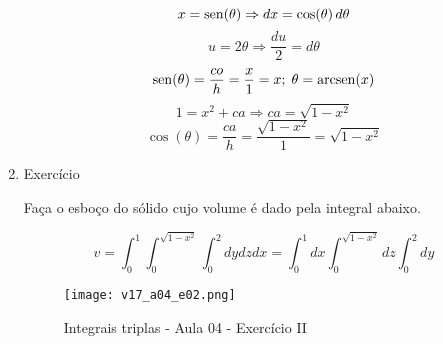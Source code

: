 \begin{enumerate}
\begin{equation*}
		x = \operatorname{sen}(\theta) \Rightarrow dx = \cos(\theta)\, d\theta
	\end{equation*}
	\begin{equation*}
		u = 2\theta \Rightarrow \dfrac{du}{2} = d\theta
	\end{equation*}
	\begin{equation*}
		\operatorname{sen}(\theta) = \dfrac{co}{h} = \dfrac{x}{1} = x;\; \theta = \operatorname{arcsen}(x)	
	\end{equation*}
	\begin{equation*}
		1 = x^2 + ca \Rightarrow ca = \sqrt{1 - x^2}
	\end{equation*}
	\begin{equation*}
		\cos(\theta) = \dfrac{ca}{h} = \dfrac{\sqrt{1 - x^2}}{1} = \sqrt{1 - x^2}
	\end{equation*}
	
	\item Exercício
	
	Faça o esboço do sólido cujo volume é dado pela integral abaixo.
	
	\begin{equation*}
		v = \int_0^1 \int_0^{\sqrt{1 - x^2}} \int_0^2 dydzdx = \int_0^1 dx \int_0^{\sqrt{1 - x^2}} dz \int_0^2 dy
	\end{equation*}
	
	\begin{figure}[htb]
		\caption{Integrais triplas - Aula 04 - Exercício II}
		\label{v17_a04_e02}
		\centering
		\texttt{[image: v17\_a04\_e02.png]}		
	\end{figure}
		

\end{enumerate}
